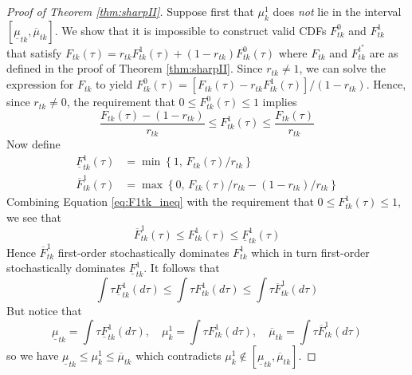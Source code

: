 \begin{proof}[Proof of Theorem \ref{thm:sharpII}]
Suppose first that $\mu^1_{k}$ does \emph{not} lie in the interval $[\underline{\mu}_{tk}, \overline{\mu}_{tk}]$.
We show that it is impossible to construct valid CDFs $F^0_{tk}$ and $F^{1}_{tk}$ that satisfy $F_{tk}(\tau) = r_{tk} F^1_{tk}(\tau) + (1 - r_{tk}) F^0_{tk}(\tau)$ where $F_{tk}$ and $F^{t^*}_{tk}$ are as defined in the proof of Theorem \ref{thm:sharpII}.
Since $r_{tk} \neq 1$, we can solve the expression for $F_{tk}$ to yield 
  $F^{0}_{tk}(\tau) = \left[ F_{tk}(\tau) - r_{tk} F^1_{tk}(\tau)\right] / (1 - r_{tk})$.
  Hence, since $r_{tk} \neq 0$, the requirement that $0 \leq F_{tk}^0(\tau) \leq 1$ implies
\begin{equation}
  \frac{F_{tk}(\tau) - (1 - r_{tk})}{r_{tk}} \leq F^{1}_{tk}(\tau) \leq \frac{F_{tk}(\tau)}{r_{tk}}
  \label{eq:F1tk_ineq}
\end{equation}
Now define 
\begin{align*}
  \underline{F}^{1}_{tk}(\tau) &=  \min\left\{ 1,\,  F_{tk}(\tau)/r_{tk} \right\}\\
\overline{F}^{1}_{tk}(\tau) &= \max\left\{ 0,\,  F_{tk}(\tau)/r_{tk} - (1 - r_{tk})/r_{tk} \right\}
\end{align*}
Combining Equation \ref{eq:F1tk_ineq} with the requirement that $0 \leq F^{1}_{tk}(\tau) \leq 1$, we see that
\[
  \overline{F}_{tk}^1(\tau) \leq F^{1}_{tk}(\tau) \leq \underline{F}_{tk}^1(\tau)
\]
Hence $\overline{F}^1_{tk}$ first-order stochastically dominates $F^{1}_{tk}$ which in turn first-order stochastically dominates $\underline{F}_{tk}^1$. 
It follows that
\[
 \int \tau \underline{F}_{tk}^1(d\tau) \leq \int \tau F^{1}_{tk}(d\tau) \leq \int \tau\overline{F}_{tk}^1(d\tau)
\]
But notice that 
\[
  \underline{\mu}_{tk} = \int \tau \underline{F}_{tk}^1(d\tau), \quad 
  \mu^1_{k} = \int \tau F^{1}_{tk}(d\tau), \quad 
  \overline{\mu}_{tk} = \int \tau\overline{F}_{tk}^1(d\tau)
\]
so we have $\underline{\mu}_{tk} \leq \mu^1_{k} \leq \overline{\mu}_{tk}$ which contradicts $\mu^1_{k} \notin [\underline{\mu}_{tk}, \overline{\mu}_{tk}]$.


\end{proof}
